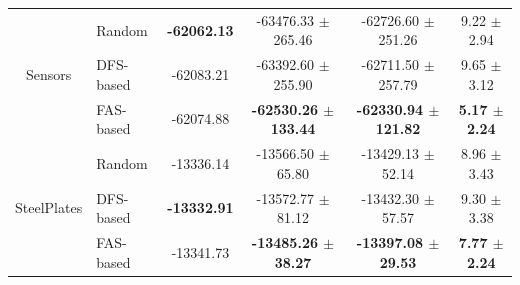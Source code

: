\begin{frame}[fragile]
{\begin{tabular}{| c | l | c | c | c | c | }
				\multirow{3}{*}{Sensors} & Random & \textbf{-62062.13} & -63476.33 $\pm$ 265.46 & -62726.60 $\pm$ 251.26 & 9.22 $\pm$ 2.94 \\ \cline{2-6} 
						& DFS-based & -62083.21 & -63392.60 $\pm$ 255.90 & -62711.50 $\pm$ 257.79 & 9.65 $\pm$ 3.12 \\ \cline{2-6}
						& FAS-based & -62074.88 & \textbf{-62530.26 $\pm$ 133.44} & \textbf{-62330.94 $\pm$ 121.82} & \textbf{5.17 $\pm$ 2.24} \\ \hline \hline

				\multirow{3}{*}{SteelPlates} & Random & -13336.14 & -13566.50 $\pm$ 65.80 & -13429.13 $\pm$ 52.14 & 8.96 $\pm$ 3.43 \\ \cline{2-6} 
						& DFS-based & \textbf{-13332.91} & -13572.77 $\pm$ 81.12 & -13432.30 $\pm$ 57.57 & 9.30 $\pm$ 3.38 \\ \cline{2-6}
						& FAS-based & -13341.73 & \textbf{-13485.26 $\pm$ 38.27} & \textbf{-13397.08 $\pm$ 29.53} & \textbf{7.77 $\pm$ 2.24} \\ \hline
			\end{tabular}
		}
	\end{frame}
